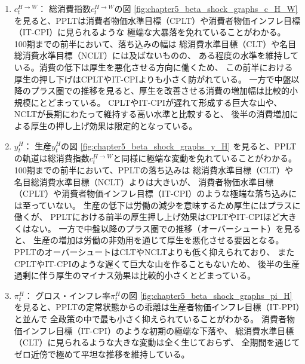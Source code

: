 \begin{enumerate}
    \item
    \label{itm:chapter5_beta_shock_policies_pplt_c_H_W}
        \(c_t^{H\to W}\)：
        総消費指数\(c_t^{H\to W}\)の図
        \ref{fig:chapter5_beta_shock_graphs_c_H_W}
        を見ると、PPLTは消費者物価水準目標（CPLT）や消費者物価インフレ目標（IT-CPI）に見られるような
        極端な大暴落を免れていることがわかる。
        100期までの前半において、落ち込みの幅は
        総消費水準目標（CLT）や名目総消費水準目標（NCLT）には及ばないものの、
        ある程度の水準を維持している。消費の低下は厚生を悪化させる方向に働くため、
        この前半における厚生の押し下げはCPLTやIT-CPIよりも小さく防がれている。
        一方で中盤以降のプラス圏での推移を見ると、厚生を改善させる消費の増加幅は比較的小規模にとどまっている。
        CPLTやIT-CPIが遅れて形成する巨大な山や、NCLTが長期にわたって維持する高い水準と比較すると、
        後半の消費増加による厚生の押し上げ効果は限定的となっている。
    \item
    \label{itm:chapter5_beta_shock_policies_pplt_y_H}
        \(y_t^H\)：
        生産\(y_t^H\)の図
        \ref{fig:chapter5_beta_shock_graphs_y_H}
        を見ると、PPLTの軌道は総消費指数\(c_t^{H\to W}\)と同様に極端な変動を免れていることがわかる。
        100期までの前半において、PPLTの落ち込みは
        総消費水準目標（CLT）や名目総消費水準目標（NCLT）よりは大きいが、
        消費者物価水準目標（CPLT）や消費者物価インフレ目標（IT-CPI）のような極端な落ち込みには至っていない。
        生産の低下は労働の減少を意味するため厚生にはプラスに働くが、
        PPLTにおける前半の厚生押し上げ効果はCPLTやIT-CPIほど大きくはない。
        一方で中盤以降のプラス圏での推移（オーバーシュート）を見ると、
        生産の増加は労働の非効用を通じて厚生を悪化させる要因となる。
        PPLTのオーバーシュートはCLTやNCLTよりも低く抑えられており、
        またCPLTやIT-CPIのような遅くて巨大な山を作ることもないため、
        後半の生産過剰に伴う厚生のマイナス効果は比較的小さくとどまっている。
    \item
    \label{itm:chapter5_beta_shock_policies_pplt_pi_H}
        \(\pi_t^H\)：
        グロス・インフレ率\(\pi_t^H\)の図
        \ref{fig:chapter5_beta_shock_graphs_pi_H}
        を見ると、PPLTの定常状態からの乖離は生産者物価インフレ目標（IT-PPI）と並んで
        全政策の中で最も小さく抑えられていることがわかる。
        消費者物価インフレ目標（IT-CPI）のような初期の極端な下落や、
        総消費水準目標（CLT）に見られるような大きな変動は全く生じておらず、
        全期間を通じてゼロ近傍で極めて平坦な推移を維持している。

\end{enumerate}
